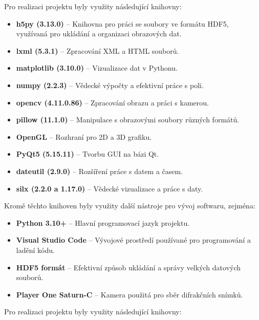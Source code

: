 \documentclass{article}
\begin{document}
Pro realizaci projektu byly využity následující knihovny:

\begin{itemize}
    \item \textbf{h5py (3.13.0)} – Knihovna pro práci se soubory ve formátu HDF5, využívaná pro ukládání a organizaci obrazových dat.
    \item \textbf{lxml (5.3.1)} – Zpracování XML a HTML souborů.
    \item \textbf{matplotlib (3.10.0)} – Vizualizace dat v Pythonu.
    \item \textbf{numpy (2.2.3)} – Vědecké výpočty a efektivní práce s poli.
    \item \textbf{opencv (4.11.0.86)} – Zpracování obrazu a práci s kamerou.
    \item \textbf{pillow (11.1.0)} – Manipulace s obrazovými soubory různých formátů.
    \item \textbf{OpenGL} – Rozhraní pro 2D a 3D grafiku.
    \item \textbf{PyQt5 (5.15.11)} – Tvorbu GUI na bázi Qt.
    \item \textbf{dateutil (2.9.0)} – Rozšíření práce s datem a časem.
    \item \textbf{silx (2.2.0 a 1.17.0)} – Vědecké vizualizace a práce s daty.
\end{itemize}

Kromě těchto knihoven byly využity další nástroje pro vývoj softwaru, zejména:

\begin{itemize}
    \item \textbf{Python 3.10+} – Hlavní programovací jazyk projektu.
    \item \textbf{Visual Studio Code} – Vývojové prostředí používané pro programování a ladění kódu.
    \item \textbf{HDF5 formát} – Efektivní způsob ukládání a správy velkých datových souborů.
    \item \textbf{Player One Saturn-C} – Kamera použitá pro sběr difrakčních snímků.
\end{itemize}


Pro realizaci projektu byly využity následující knihovny:
\end{document}
